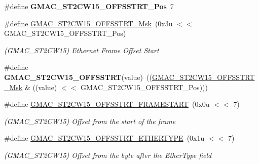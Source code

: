 \begin{DoxyCompactItemize}
\item 
\mbox{\label{group__SAMV71__GMAC_gaaf7e7377f5f9e44d38973bad2f6080d8}} 
\#define {\bfseries G\+M\+A\+C\+\_\+\+S\+T2\+C\+W15\+\_\+\+O\+F\+F\+S\+S\+T\+R\+T\+\_\+\+Pos}~7
\item 
\mbox{\label{group__SAMV71__GMAC_ga09278b6f0c333c3f9c7e93be55b01f5f}} 
\#define \mbox{\hyperlink{group__SAMV71__GMAC_ga09278b6f0c333c3f9c7e93be55b01f5f}{G\+M\+A\+C\+\_\+\+S\+T2\+C\+W15\+\_\+\+O\+F\+F\+S\+S\+T\+R\+T\+\_\+\+Msk}}~(0x3u $<$$<$ G\+M\+A\+C\+\_\+\+S\+T2\+C\+W15\+\_\+\+O\+F\+F\+S\+S\+T\+R\+T\+\_\+\+Pos)
\begin{DoxyCompactList}\small\item\em (G\+M\+A\+C\+\_\+\+S\+T2\+C\+W15) Ethernet Frame Offset Start \end{DoxyCompactList}\item 
\mbox{\label{group__SAMV71__GMAC_gacd8d140181d45eec7918c46a8eb2dc01}} 
\#define {\bfseries G\+M\+A\+C\+\_\+\+S\+T2\+C\+W15\+\_\+\+O\+F\+F\+S\+S\+T\+RT}(value)~((\mbox{\hyperlink{group__SAMV71__GMAC_ga09278b6f0c333c3f9c7e93be55b01f5f}{G\+M\+A\+C\+\_\+\+S\+T2\+C\+W15\+\_\+\+O\+F\+F\+S\+S\+T\+R\+T\+\_\+\+Msk}} \& ((value) $<$$<$ G\+M\+A\+C\+\_\+\+S\+T2\+C\+W15\+\_\+\+O\+F\+F\+S\+S\+T\+R\+T\+\_\+\+Pos)))
\item 
\mbox{\label{group__SAMV71__GMAC_gac98fe4c5bcbe2e8a1f627d4589ebddf6}} 
\#define \mbox{\hyperlink{group__SAMV71__GMAC_gac98fe4c5bcbe2e8a1f627d4589ebddf6}{G\+M\+A\+C\+\_\+\+S\+T2\+C\+W15\+\_\+\+O\+F\+F\+S\+S\+T\+R\+T\+\_\+\+F\+R\+A\+M\+E\+S\+T\+A\+RT}}~(0x0u $<$$<$ 7)
\begin{DoxyCompactList}\small\item\em (G\+M\+A\+C\+\_\+\+S\+T2\+C\+W15) Offset from the start of the frame \end{DoxyCompactList}\item 
\mbox{\label{group__SAMV71__GMAC_ga46e49d4735f7b10fbfe59d5f5e98fc2d}} 
\#define \mbox{\hyperlink{group__SAMV71__GMAC_ga46e49d4735f7b10fbfe59d5f5e98fc2d}{G\+M\+A\+C\+\_\+\+S\+T2\+C\+W15\+\_\+\+O\+F\+F\+S\+S\+T\+R\+T\+\_\+\+E\+T\+H\+E\+R\+T\+Y\+PE}}~(0x1u $<$$<$ 7)
\begin{DoxyCompactList}\small\item\em (G\+M\+A\+C\+\_\+\+S\+T2\+C\+W15) Offset from the byte after the Ether\+Type field \end{DoxyCompactList}\item 

\end{DoxyCompactItemize}
